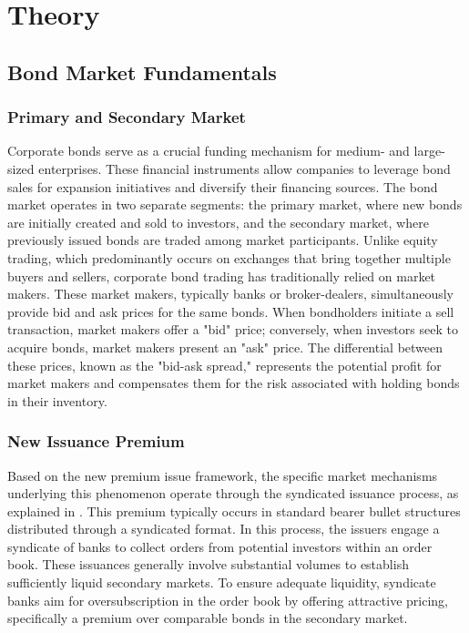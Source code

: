 \chapter{Theory}
\label{ch:theory}

\section{Bond Market Fundamentals}

\subsection{Primary and Secondary Market}

Corporate bonds serve as a crucial funding mechanism for medium- and large-sized enterprises. These financial instruments allow companies to leverage bond sales for expansion initiatives and diversify their financing sources. The bond market operates in two separate segments: the primary market, where new bonds are initially created and sold to investors, and the secondary market, where previously issued bonds are traded among market participants. Unlike equity trading, which predominantly occurs on exchanges that bring together multiple buyers and sellers, corporate bond trading has traditionally relied on market makers. These market makers, typically banks or broker-dealers, simultaneously provide bid and ask prices for the same bonds. When bondholders initiate a sell transaction, market makers offer a "bid" price; conversely, when investors seek to acquire bonds, market makers present an "ask" price. The differential between these prices, known as the "bid-ask spread," represents the potential profit for market makers and compensates them for the risk associated with holding bonds in their inventory.

\subsection{New Issuance Premium}

Based on the new premium issue framework, the specific market mechanisms underlying this phenomenon operate through the syndicated issuance process, as explained in \parencite{Traczyk2024NewFactor}. This premium typically occurs in standard bearer bullet structures distributed through a syndicated format. In this process, the issuers engage a syndicate of banks to collect orders from potential investors within an order book. These issuances generally involve substantial volumes to establish sufficiently liquid secondary markets. To ensure adequate liquidity, syndicate banks aim for oversubscription in the order book by offering attractive pricing, specifically a premium over comparable bonds in the secondary market. 

